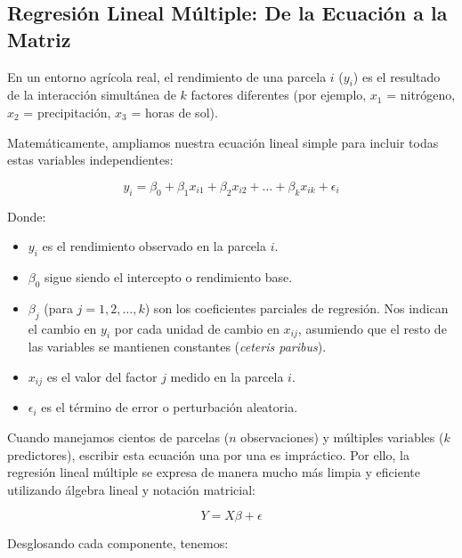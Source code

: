 \documentclass{article}
\begin{document}
\subsection{Regresión Lineal Múltiple: De la Ecuación a la Matriz}

En un entorno agrícola real, el rendimiento de una parcela $i$ ($y_i$) es el resultado de la interacción simultánea de $k$ factores diferentes (por ejemplo, $x_{1}$ = nitrógeno, $x_{2}$ = precipitación, $x_{3}$ = horas de sol). 

Matemáticamente, ampliamos nuestra ecuación lineal simple para incluir todas estas variables independientes:

$$ y_i = \beta_0 + \beta_1 x_{i1} + \beta_2 x_{i2} + \dots + \beta_k x_{ik} + \epsilon_i $$

Donde:
\begin{itemize}
    \item $y_i$ es el rendimiento observado en la parcela $i$.
    \item $\beta_0$ sigue siendo el intercepto o rendimiento base.
    \item $\beta_j$ (para $j = 1, 2, \dots, k$) son los coeficientes parciales de regresión. Nos indican el cambio en $y_i$ por cada unidad de cambio en $x_{ij}$, asumiendo que el resto de las variables se mantienen constantes (\textit{ceteris paribus}).
    \item $x_{ij}$ es el valor del factor $j$ medido en la parcela $i$.
    \item $\epsilon_i$ es el término de error o perturbación aleatoria.
\end{itemize}

Cuando manejamos cientos de parcelas ($n$ observaciones) y múltiples variables ($k$ predictores), escribir esta ecuación una por una es impráctico. Por ello, la regresión lineal múltiple se expresa de manera mucho más limpia y eficiente utilizando álgebra lineal y notación matricial:

$$ Y = X\beta + \epsilon $$

Desglosando cada componente, tenemos:
\end{document}

